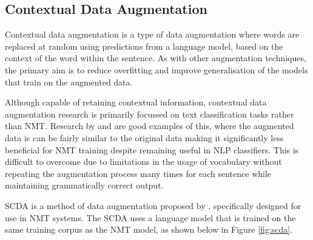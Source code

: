 





\subsection{Contextual Data Augmentation}

Contextual data augmentation is a type of data augmentation where words are replaced at random using predictions from a language model, based on the context of the word within the sentence. As with other augmentation techniques, the primary aim is to reduce overfitting and improve generalisation of the models that train on the augmented data. 

Although capable of retaining contextual information, contextual data augmentation research is primarily focussed on text classification tasks rather than \acrshort{NMT}. Research by \cite{wu_conditional_2018} and \cite{kobayashi_contextual_2018} are good examples of this, where the augmented data is can be fairly similar to the original data making it significantly less beneficial for \acrshort{NMT} training despite remaining useful in \acrshort{NLP} classifiers. This is difficult to overcome due to limitations in the usage of vocabulary without repeating the augmentation process many times for each sentence while maintaining grammatically correct output.

\acrfull{SCDA} is a method of data augmentation proposed by \cite{zhu_soft_2019}, specifically designed for use in \acrshort{NMT} systems. The \acrshort{SCDA} uses a language model that is trained on the same training corpus as the \acrshort{NMT} model, as shown below in Figure \ref{fig:scda}.

